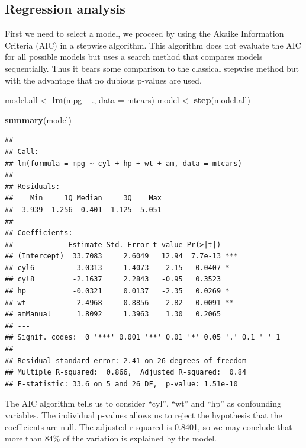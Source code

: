 \documentclass[a3paper]{article}
\newenvironment{Shaded}{\begin{snugshade}}{\end{snugshade}}
\newcommand{\KeywordTok}[1]{\textcolor[rgb]{0.13,0.29,0.53}{\textbf{{#1}}}}
\newcommand{\DataTypeTok}[1]{\textcolor[rgb]{0.13,0.29,0.53}{{#1}}}
\newcommand{\StringTok}[1]{\textcolor[rgb]{0.31,0.60,0.02}{{#1}}}
\newcommand{\NormalTok}[1]{{#1}}
\begin{document}
\subsection{Regression analysis}\label{regression-analysis}

First we need to select a model, we proceed by using the Akaike
Information Criteria (AIC) in a stepwise algorithm. This algorithm does
not evaluate the AIC for all possible models but uses a search method
that compares models sequentially. Thus it bears some comparison to the
classical stepwise method but with the advantage that no dubious
p-values are used.

\begin{Shaded}
\begin{Highlighting}[]
\NormalTok{model.all <-}\StringTok{ }\KeywordTok{lm}\NormalTok{(mpg ~}\StringTok{ }\NormalTok{., }\DataTypeTok{data =} \NormalTok{mtcars)}
\NormalTok{model <-}\StringTok{ }\KeywordTok{step}\NormalTok{(model.all)}
\end{Highlighting}
\end{Shaded}

\begin{Shaded}
\begin{Highlighting}[]
\KeywordTok{summary}\NormalTok{(model)}
\end{Highlighting}
\end{Shaded}

\begin{verbatim}
## 
## Call:
## lm(formula = mpg ~ cyl + hp + wt + am, data = mtcars)
## 
## Residuals:
##    Min     1Q Median     3Q    Max 
## -3.939 -1.256 -0.401  1.125  5.051 
## 
## Coefficients:
##             Estimate Std. Error t value Pr(>|t|)    
## (Intercept)  33.7083     2.6049   12.94  7.7e-13 ***
## cyl6         -3.0313     1.4073   -2.15   0.0407 *  
## cyl8         -2.1637     2.2843   -0.95   0.3523    
## hp           -0.0321     0.0137   -2.35   0.0269 *  
## wt           -2.4968     0.8856   -2.82   0.0091 ** 
## amManual      1.8092     1.3963    1.30   0.2065    
## ---
## Signif. codes:  0 '***' 0.001 '**' 0.01 '*' 0.05 '.' 0.1 ' ' 1
## 
## Residual standard error: 2.41 on 26 degrees of freedom
## Multiple R-squared:  0.866,  Adjusted R-squared:  0.84 
## F-statistic: 33.6 on 5 and 26 DF,  p-value: 1.51e-10
\end{verbatim}

The AIC algorithm tells us to consider ``cyl'', ``wt'' and ``hp'' as
confounding variables. The individual p-values allows us to reject the
hypothesis that the coefficients are null. The adjusted r-squared is
0.8401, so we may conclude that more than 84\% of the variation is
explained by the model.
\end{document}
